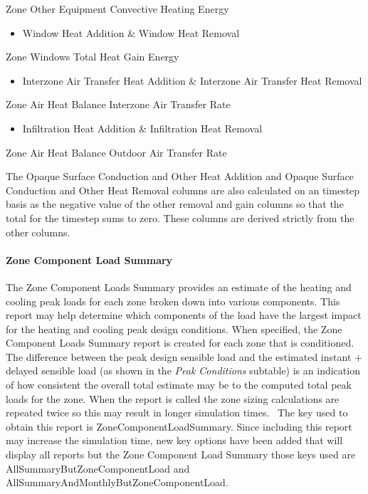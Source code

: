 Zone Other Equipment Convective Heating Energy

\begin{itemize}
\tightlist
\item
  Window Heat Addition \& Window Heat Removal
\end{itemize}

Zone Windows Total Heat Gain Energy

\begin{itemize}
\tightlist
\item
  Interzone Air Transfer Heat Addition \& Interzone Air Transfer Heat Removal
\end{itemize}

Zone Air Heat Balance Interzone Air Transfer Rate

\begin{itemize}
\tightlist
\item
  Infiltration Heat Addition \& Infiltration Heat Removal
\end{itemize}

Zone Air Heat Balance Outdoor Air Transfer Rate

The Opaque Surface Conduction and Other Heat Addition and Opaque Surface Conduction and Other Heat Removal columns are also calculated on an timestep basis as the negative value of the other removal and gain columns so that the total for the timestep sums to zero. These columns are derived strictly from the other columns.

\paragraph{Zone Component Load Summary}\label{zone-component-load-summary}

The Zone Component Loads Summary provides an estimate of the heating and cooling peak loads for each zone broken down into various components. This report may help determine which components of the load have the largest impact for the heating and cooling peak design conditions. When specified, the Zone Component Loads Summary report is created for each zone that is conditioned. The difference between the peak design sensible load and the estimated instant + delayed sensible load (as shown in the \emph{Peak Conditions} subtable) is an indication of how consistent the overall total estimate may be to the computed total peak loads for the zone. When the report is called the zone sizing calculations are repeated twice so this may result in longer simulation times.~ The key used to obtain this report is ZoneComponentLoadSummary. Since including this report may increase the simulation time, new key options have been added that will display all reports but the Zone Component Load Summary those keys used are AllSummaryButZoneComponentLoad and AllSummaryAndMonthlyButZoneComponentLoad.

